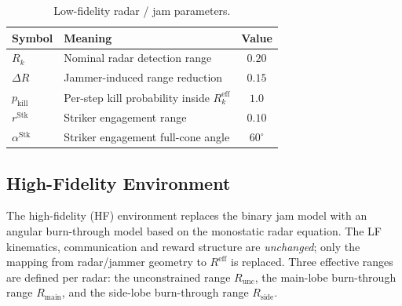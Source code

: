 \begin{table}[H]
\centering
\caption{Low-fidelity radar / jam parameters.}
\label{tab:lf_params}
\begin{tabular}{@{}llc@{}}
\toprule
Symbol & Meaning & Value \\ \midrule
$R_k$            & Nominal radar detection range       & $0.20$ \\
$\Delta R$       & Jammer-induced range reduction      & $0.15$ \\
$p_{\mathrm{kill}}$ & Per-step kill probability inside $R^{\mathrm{eff}}_k$ & $1.0$ \\
$r^{\mathrm{Stk}}$  & Striker engagement range         & $0.10$ \\
$\alpha^{\mathrm{Stk}}$ & Striker engagement full-cone angle & $60^{\circ}$ \\
\bottomrule
\end{tabular}
\end{table}

\subsection{High-Fidelity Environment}
\label{sec:hf_env}

The high-fidelity (HF) environment replaces the binary jam model with an
angular burn-through model based on the monostatic radar equation. The LF
kinematics, communication and reward structure are \emph{unchanged}; only the
mapping from radar/jammer geometry to $R^{\mathrm{eff}}$ is replaced. Three
effective ranges are defined per radar: the unconstrained range
$R_{\mathrm{unc}}$, the main-lobe burn-through range $R_{\mathrm{main}}$,
and the side-lobe burn-through range $R_{\mathrm{side}}$.

